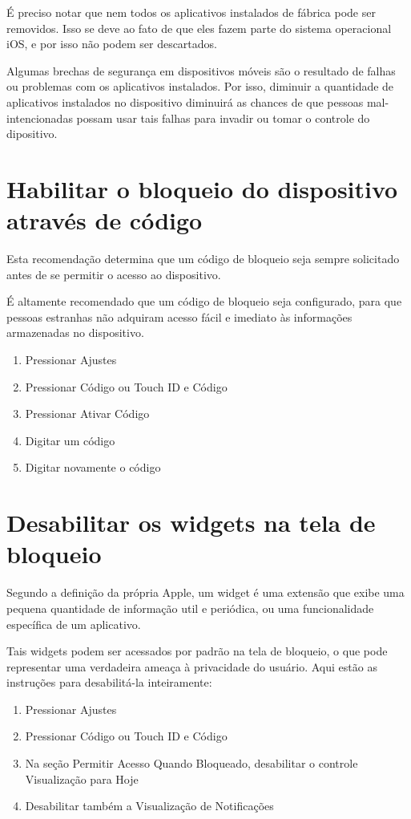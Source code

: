 \'E preciso notar que nem todos os aplicativos instalados de f\'abrica pode ser removidos. Isso se deve ao fato de que eles fazem parte do sistema operacional iOS, e por isso n\~ao podem ser descartados. 

Algumas brechas de seguran\c ca em dispositivos m\'oveis s\~ao o resultado de falhas ou problemas com os aplicativos instalados. Por isso, diminuir a quantidade de aplicativos instalados no dispositivo diminuir\'a as chances de que pessoas mal-intencionadas possam usar tais falhas para invadir ou tomar o controle do dipositivo.

\section{Habilitar o bloqueio do dispositivo atrav\'es de c\'odigo}

Esta recomenda\c c\~ao determina que um c\'odigo de bloqueio seja sempre solicitado antes de se permitir o acesso ao dispositivo. 

\'E altamente recomendado que um c\'odigo de bloqueio seja configurado, para que pessoas estranhas n\~ao adquiram acesso f\'acil e imediato \`as informa\c c\~oes armazenadas no dispositivo. 

\begin{enumerate}
\item Pressionar Ajustes
\item Pressionar C\'odigo ou Touch ID e C\'odigo
\item Pressionar Ativar C\'odigo
\item Digitar um c\'odigo
\item Digitar novamente o c\'odigo
\end{enumerate}

\section{Desabilitar os widgets na tela de bloqueio}

Segundo a defini\c c\~ao da pr\'opria Apple, um widget \'e uma extens\~ao que exibe uma pequena quantidade de informa\c c\~ao util e peri\'odica, ou uma funcionalidade espec\'ifica de um aplicativo. 

Tais widgets podem ser acessados por padr\~ao na tela de bloqueio, o que pode representar uma verdadeira amea\c ca \`a privacidade do usu\'ario. 
Aqui est\~ao as instru\c c\~oes para desabilit\'a-la inteiramente:

\begin{enumerate}
\item Pressionar Ajustes
\item Pressionar C\'odigo ou Touch ID e C\'odigo
\item Na se\c c\~ao Permitir Acesso Quando Bloqueado, desabilitar o controle Visualiza\c c\~ao para Hoje
\item Desabilitar tamb\'em a Visualiza\c c\~ao de Notifica\c c\~oes
\end{enumerate}

